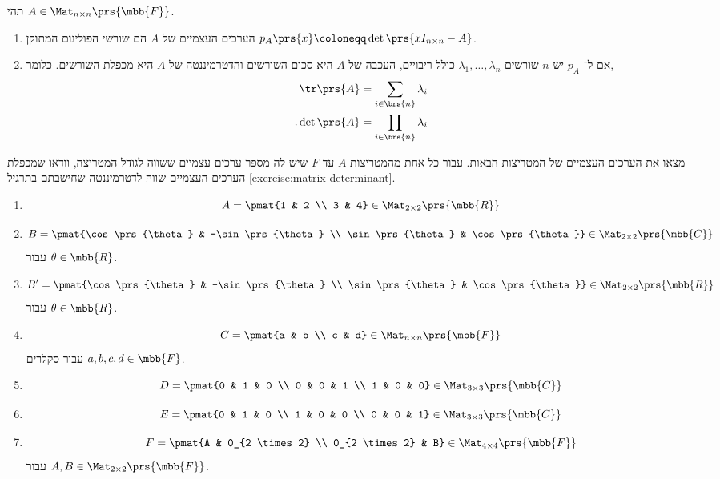 \documentclass[a4paper,10pt,twoside,openany]{article}
\begin{document}
\begin{theorem}
תהי
$A \in \Mat_{n \times n}\prs{\mbb{F}}$.
\begin{enumerate}
\item
הערכים העצמיים של $A$
הם שורשי הפולינום המתוקן
$p_A\prs{x} \coloneqq \det\prs{xI_{n \times n} - A}$.
\item
אם ל־%
$p_A$
יש
$n$
שורשים
$\lambda_1, \ldots, \lambda_n$
כולל ריבויים, העכבה של $A$ היא סכום השורשים והדטרמיננטה של
$A$
היא מכפלת השורשים. כלומר,
\begin{align*}
\tr\prs{A} &= \sum_{i \in \brs{n}} \lambda_i \\
\text{.} \det\prs{A} &= \prod_{i \in \brs{n}} \lambda_i
\end{align*}
\end{enumerate}
\end{theorem}

\begin{exercise}
מצאו את הערכים העצמיים של המטריצות הבאות. עבור כל אחת מהמטריצות
$A$
עד
$F$
שיש לה מספר ערכים עצמיים ששווה לגודל המטריצה,
וודאו שמכפלת הערכים העצמיים שווה לדטרמיננטה שחישבתם בתרגיל
\ref{exercise:matrix-determinant}.
\begin{enumerate}
\item \[A = \pmat{1 & 2 \\ 3 & 4} \in \Mat_{2 \times 2}\prs{\mbb{R}}\]
\item \[B = \pmat{\cos\prs{\theta} & -\sin\prs{\theta} \\ \sin\prs{\theta} & \cos\prs{\theta}} \in \Mat_{2 \times 2}\prs{\mbb{C}}\]
עבור
$\theta \in \mbb{R}$.
\item \[B' = \pmat{\cos\prs{\theta} & -\sin\prs{\theta} \\ \sin\prs{\theta} & \cos\prs{\theta}} \in \Mat_{2 \times 2}\prs{\mbb{R}}\]
עבור
$\theta \in \mbb{R}$.
\item \[C = \pmat{a & b \\ c & d} \in \Mat_{n \times n}\prs{\mbb{F}}\]
עבור סקלרים
$a,b,c,d \in \mbb{F}$.
\item \[D = \pmat{0 & 1 & 0 \\ 0 & 0 & 1 \\ 1 & 0 & 0} \in \Mat_{3 \times 3}\prs{\mbb{C}}\]
\item \[E = \pmat{0 & 1 & 0 \\ 1 & 0 & 0 \\ 0 & 0 & 1} \in \Mat_{3 \times 3}\prs{\mbb{C}}\]
\item \[F = \pmat{A & 0_{2 \times 2} \\ 0_{2 \times 2} & B} \in \Mat_{4 \times 4}\prs{\mbb{F}}\]
עבור
$A,B \in \Mat_{2 \times 2}\prs{\mbb{F}}$.
\end{enumerate}
\end{exercise}
\end{document}
